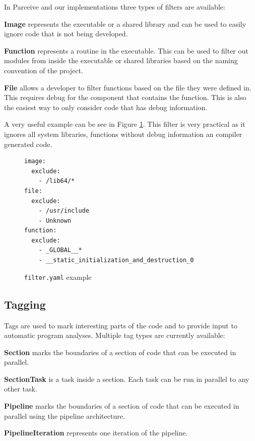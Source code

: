 In Parceive and our implementations three types of filters are available:

\textbf{Image} represents the executable or a shared library and can be used to easily ignore code that is not being developed.

\textbf{Function} represents a routine in the executable. This can be used to filter out modules from inside the executable or shared libraries based on the naming convention of the project.

\textbf{File} allows a developer to filter functions based on the file they were defined in. This requires debug for the component that contains the function. This is also the easiest way to only consider code that has debug information.

A very useful example can be see in Figure \ref{cap3:filter-example}. This filter is very practical as it ignores all system libraries, functions without debug information an compiler generated code.

\begin{figure}
	\begin{center}
		\begin{verbatim}
image:
  exclude:
    - /lib64/*
file:
  exclude:
    - /usr/include
    - Unknown
function:
  exclude:
    - _GLOBAL__*
    - __static_initialization_and_destruction_0
		\end{verbatim}
	\end{center}
	\caption{\texttt{filter.yaml} example}
	\label{cap3:filter-example}
\end{figure}

\subsection{Tagging}

Tags are used to mark interesting parts of the code and to provide input to automatic program analyses. Multiple tag types are currently available:

\textbf{Section} marks the boundaries of a section of code that can be executed in parallel.

\textbf{SectionTask} is a task inside a section. Each task can be run in parallel to any other task.

\textbf{Pipeline} marks the boundaries of a section of code that can be executed in parallel using the pipeline architecture.

\textbf{PipelineIteration} represents one iteration of the pipeline.

